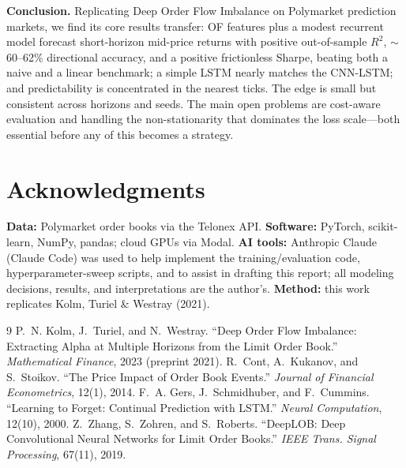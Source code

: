 \documentclass[10pt,twocolumn]{article}
\begin{document}
\textbf{Conclusion.} Replicating Deep Order Flow Imbalance on Polymarket
prediction markets, we find its core results transfer: OF features plus a modest
recurrent model forecast short-horizon mid-price returns with positive
out-of-sample $R^2$, $\sim$60--62\% directional accuracy, and a positive
frictionless Sharpe, beating both a naive and a linear benchmark; a simple LSTM
nearly matches the CNN-LSTM; and predictability is concentrated in the nearest
ticks. The edge is small but consistent across horizons and seeds. The main open
problems are cost-aware evaluation and handling the non-stationarity that
dominates the loss scale---both essential before any of this becomes a strategy.

\section*{Acknowledgments}
\textbf{Data:} Polymarket order books via the Telonex API. \textbf{Software:}
PyTorch, scikit-learn, NumPy, pandas; cloud GPUs via Modal. \textbf{AI tools:}
Anthropic Claude (Claude Code) was used to help implement the training/evaluation
code, hyperparameter-sweep scripts, and to assist in drafting this report; all
modeling decisions, results, and interpretations are the author's. \textbf{Method:}
this work replicates Kolm, Turiel \& Westray (2021).

\begin{thebibliography}{9}
\small
{} P.~N. Kolm, J.~Turiel, and N.~Westray. ``Deep Order Flow
Imbalance: Extracting Alpha at Multiple Horizons from the Limit Order Book.''
\emph{Mathematical Finance}, 2023 (preprint 2021).
 R.~Cont, A.~Kukanov, and S.~Stoikov. ``The Price Impact of Order
Book Events.'' \emph{Journal of Financial Econometrics}, 12(1), 2014.
 F.~A. Gers, J.~Schmidhuber, and F.~Cummins. ``Learning to Forget:
Continual Prediction with LSTM.'' \emph{Neural Computation}, 12(10), 2000.
 Z.~Zhang, S.~Zohren, and S.~Roberts. ``DeepLOB: Deep Convolutional
Neural Networks for Limit Order Books.'' \emph{IEEE Trans. Signal Processing},
67(11), 2019.
\end{thebibliography}
\end{document}
